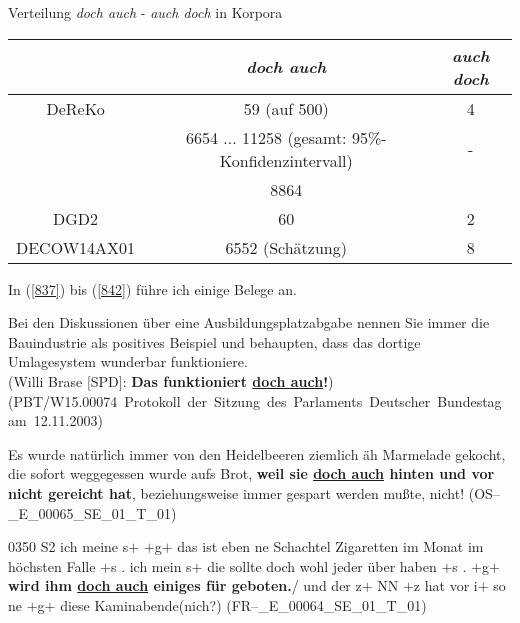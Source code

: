 {\begin{exe}
	\ex\label{836} Verteilung \textit{doch auch} - \textit{auch doch} in Korpora\\[-1em]
	\begin{tabular}[t]{|c|c|c|}
	\hline
	& \textit{doch auch} & \textit{auch doch}\\
	\hline
	DeReKo & 59 (\scriptsize{auf 500}) & 4\\
	& 6654 ... 11258 \scriptsize{(gesamt: 95\%-Konfidenzintervall}) & -\\
	& 8864 & \\
	\hline
	DGD2 & 60 & 2\\
	\hline
	DECOW14AX01 & 6552 \scriptsize{(Schätzung)} & 8\\
	\hline				 
    \end{tabular}    
\end{exe}	
In (\ref{837}) bis (\ref{842}) führe ich einige Belege an.

\begin{exe}
	\ex\label{837}
	\scriptsize
	Bei den Diskussionen über eine Ausbildungsplatzabgabe nennen Sie immer die Bauindustrie als positives Beispiel und behaupten, dass das dortige 				Umlagesystem wunderbar funktioniere.\\
	(Willi Brase $[$SPD$]$: \textbf{Das funktioniert \underline{doch auch}!})
	\newline
	\hbox{}\hfill\hbox{(PBT/W15.00074 Protokoll der Sitzung des Parlaments Deutscher Bundestag am 12.11.2003)}
\end{exe}

\begin{exe}
	\ex\label{838}
	\scriptsize
	Es wurde natürlich immer von den Heidelbeeren ziemlich äh Marmelade gekocht, die sofort weggegessen wurde aufs Brot, \textbf{weil sie \underline{doch 		auch} hinten und vor nicht gereicht hat}, beziehungsweise immer ge\-spart werden mußte, nicht!	         
	\hfill\hbox{(OS--\_E\_00065\_SE\_01\_T\_01)}
\end{exe}

\begin{exe}
	\ex\label{839}
	\scriptsize
	0350 S2	ich meine s$+$ $+$g$+$ das ist eben ne Schachtel Zigaretten im Monat im höchsten Falle $+$s . ich mein s$+$ die sollte doch wohl jeder über 		haben $+$s . $+$g$+$ \textbf{wird ihm \underline{doch auch} einiges für geboten.}/ und der z$+$ NN $+$z hat vor i$+$ so ne $+$g$+$ diese 					Kaminabende(nich?)	         
	\hfill\hbox{(FR--\_E\_00064\_SE\_01\_T\_01)}
\end{exe}			

}
